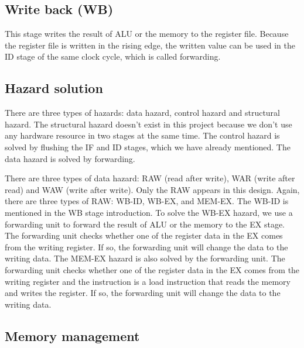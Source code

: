 \documentclass[
	a4paper, %
	11pt, %
]{CSUniSchoolLabReport}
\begin{document}
\subsection*{Write back (WB)}
This stage writes the result of ALU or the memory to the register file. Because the register file is written in the rising edge, the written value can be used in the ID stage of the same clock cycle, which is called forwarding.

\subsection*{Hazard solution}
There are three types of hazards: data hazard, control hazard and structural hazard. The structural hazard doesn't exist in this project because we don't use any hardware resource in two stages at the same time. The control hazard is solved by flushing the IF and ID stages, which we have already mentioned. The data hazard is solved by forwarding.

There are three types of data hazard: RAW (read after write), WAR (write after read) and WAW (write after write). Only the RAW appears in this design. Again, there are three types of RAW: WB-ID, WB-EX, and MEM-EX. The WB-ID is mentioned in the WB stage introduction. To solve the WB-EX hazard, we use a forwarding unit to forward the result of ALU or the memory to the EX stage. The forwarding unit checks whether one of the register data in the EX comes from the writing register. If so, the forwarding unit will change the data to the writing data. The MEM-EX hazard is also solved by the forwarding unit. The forwarding unit checks whether one of the register data in the EX comes from the writing register and the instruction is a load instruction that reads the memory and writes the register. If so, the forwarding unit will change the data to the writing data.

\subsection{Memory management}
\end{document}
